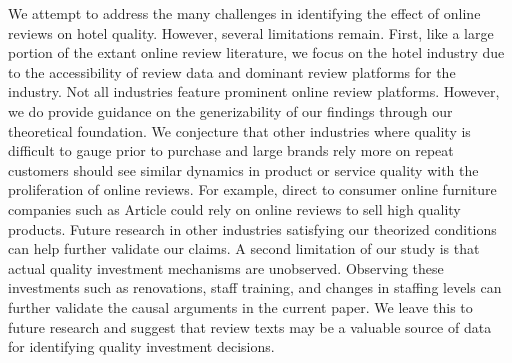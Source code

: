 \documentclass[12pt, leqno]{article}
\begin{document}
We attempt to address the many challenges in identifying the effect of online reviews on hotel quality. However, several limitations remain. First, like a large portion of the extant online review literature, we focus on the hotel industry due to the accessibility of review data and dominant review platforms for the industry. Not all industries feature prominent online review platforms. However, we do provide guidance on the generizability of our findings through our theoretical foundation. We conjecture that  other industries where quality is difficult to gauge prior to purchase and large brands rely more on repeat customers should see similar dynamics in product or service quality with the proliferation of online reviews. For example, direct to consumer online furniture companies such as Article could rely on online reviews to sell high quality products. Future research in other industries satisfying our theorized conditions can help further validate our claims. A second limitation of our study is that actual quality investment mechanisms are unobserved. Observing these investments such as renovations, staff training, and changes in staffing levels can further validate the causal arguments in the current paper. We leave this to future research and suggest that review texts may be a valuable source of data for identifying quality investment decisions.











\end{document}
